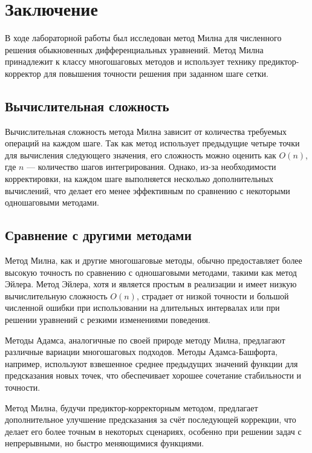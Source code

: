 \section{Заключение}

В ходе лабораторной работы был исследован метод Милна для численного решения обыкновенных дифференциальных уравнений. Метод Милна принадлежит к классу многошаговых методов и использует технику предиктор-корректор для повышения точности решения при заданном шаге сетки.

\subsection{Вычислительная сложность}

Вычислительная сложность метода Милна зависит от количества требуемых операций на каждом шаге. Так как метод использует предыдущие четыре точки для вычисления следующего значения, его сложность можно оценить как \(O(n)\), где \(n\) — количество шагов интегрирования. Однако, из-за необходимости корректировки, на каждом шаге выполняется несколько дополнительных вычислений, что делает его менее эффективным по сравнению с некоторыми одношаговыми методами.

\subsection{Сравнение с другими методами}

Метод Милна, как и другие многошаговые методы, обычно предоставляет более высокую точность по сравнению с одношаговыми методами, такими как метод Эйлера. Метод Эйлера, хотя и является простым в реализации и имеет низкую вычислительную сложность \(O(n)\), страдает от низкой точности и большой численной ошибки при использовании на длительных интервалах или при решении уравнений с резкими изменениями поведения.

Методы Адамса, аналогичные по своей природе методу Милна, предлагают различные вариации многошаговых подходов. Методы Адамса-Башфорта, например, используют взвешенное среднее предыдущих значений функции для предсказания новых точек, что обеспечивает хорошее сочетание стабильности и точности.

Метод Милна, будучи предиктор-корректорным методом, предлагает дополнительное улучшение предсказания за счёт последующей коррекции, что делает его более точным в некоторых сценариях, особенно при решении задач с непрерывными, но быстро меняющимися функциями.


